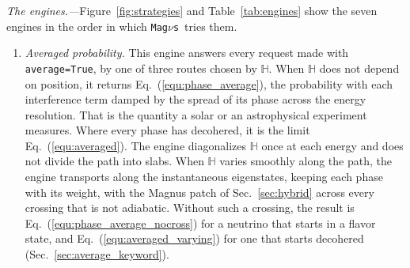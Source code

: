 \documentclass[final,5p,times,twocolumn,sort,compress]{elsarticle}
\makeatletter
\newcommand{\eq}{Eq.}
\DeclareRobustCommand{\_}{%
  \ifmmode\nfss@text{\textunderscore}\else\textunderscore\allowbreak\fi}
\newcommand{\Tab}{Table}
\newcommand{\equ}[1]{\eq~(\ref{equ:#1})}
\newcommand{\tabl}[1]{\Tab~\ref{tab:#1}}
\newcommand{\magnus}{{\tt Mag}\ensuremath{\nu}{\tt s}}
\makeatother
\begin{document}
\textit{The engines.---}Figure~\ref{fig:strategies} and \tabl{engines} show the seven engines in the order in which \magnus\ tries them.
\begin{enumerate}
\item \emph{Averaged probability.} This engine answers every request made with {\tt average=True}, by one of three routes chosen by $\mathbb{H}$. When $\mathbb{H}$ does not depend on position, it returns \equ{phase_average}, the probability with each interference term damped by the spread of its phase across the energy resolution. That is the quantity a solar or an astrophysical experiment measures. Where every phase has decohered, it is the limit \equ{averaged}. The engine diagonalizes $\mathbb{H}$ once at each energy and does not divide the path into slabs. When $\mathbb{H}$ varies smoothly along the path, the engine transports along the instantaneous eigenstates, keeping each phase with its weight, with the Magnus patch of Sec.~\ref{sec:hybrid} across every crossing that is not adiabatic. Without such a crossing, the result is \equ{phase_average_nocross} for a neutrino that starts in a flavor state, and \equ{averaged_varying} for one that starts decohered (Sec.~\ref{sec:average_keyword}).


\end{enumerate}
\end{document}
